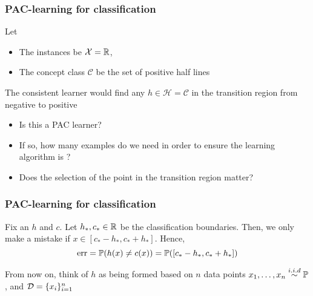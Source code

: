 \documentclass[12pt]{beamer}
\begin{document}
\begin{frame}[fragile]
\frametitle{PAC-learning for classification}
 Let 
\begin{itemize}
\item The instances be $\mathcal{X} = \R$,
\item The concept class $\mathcal{C}$ be the set of positive half lines 

\end{itemize}
\vsp

The consistent learner would find any $h \in \mathcal{H} = \mathcal{C}$ in the transition region from negative to positive

\vsp
\begin{itemize}
\item Is this a PAC learner?  
\item If so, how many examples do we need in order to ensure the learning algorithm is 
?

\item Does the selection of the point in the transition region matter?
\end{itemize}

\end{frame}

\begin{frame}[fragile]
\frametitle{PAC-learning for classification}
  Fix an $h$ and $c$.   Let $h_*,c_* \in \R$ be the 
classification boundaries. Then, we only make a mistake
if $x \in [c_*-h_*,c_*+h_*]$.  Hence, 
\[
\textrm{err}=\P(h(x) \neq c(x))= \P([c_*-h_*,c_*+h_*])
\]



\vsp
{} From now on, think of 
$h$ as being formed based on $n$ data points $x_1,\ldots,x_n \stackrel{i.i.d}{\sim} \P$, and $\data = \{x_i\}_{i=1}^n$
\end{frame}
\end{document}
